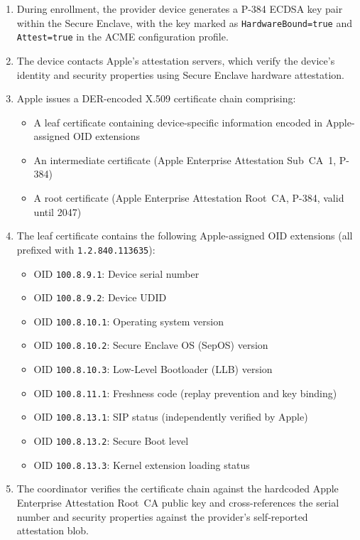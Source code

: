\documentclass[11pt,letterpaper]{article}
\begin{document}
\begin{enumerate}[nosep]
\item During enrollment, the provider device generates a P-384 ECDSA key pair within the Secure Enclave, with the key marked as \texttt{HardwareBound=true} and \texttt{Attest=true} in the ACME configuration profile.

\item The device contacts Apple's attestation servers, which verify the device's identity and security properties using Secure Enclave hardware attestation.

\item Apple issues a DER-encoded X.509 certificate chain comprising:
  \begin{itemize}[nosep]
  \item A leaf certificate containing device-specific information encoded in Apple-assigned OID extensions
  \item An intermediate certificate (Apple Enterprise Attestation Sub~CA~1, P-384)
  \item A root certificate (Apple Enterprise Attestation Root~CA, P-384, valid until 2047)
  \end{itemize}

\item The leaf certificate contains the following Apple-assigned OID extensions (all prefixed with \texttt{1.2.840.113635}):
  \begin{itemize}[nosep]
  \item OID \texttt{100.8.9.1}: Device serial number
  \item OID \texttt{100.8.9.2}: Device UDID
  \item OID \texttt{100.8.10.1}: Operating system version
  \item OID \texttt{100.8.10.2}: Secure Enclave OS (SepOS) version
  \item OID \texttt{100.8.10.3}: Low-Level Bootloader (LLB) version
  \item OID \texttt{100.8.11.1}: Freshness code (replay prevention and key binding)
  \item OID \texttt{100.8.13.1}: SIP status (independently verified by Apple)
  \item OID \texttt{100.8.13.2}: Secure Boot level
  \item OID \texttt{100.8.13.3}: Kernel extension loading status
  \end{itemize}

\item The coordinator verifies the certificate chain against the hardcoded Apple Enterprise Attestation Root~CA public key and cross-references the serial number and security properties against the provider's self-reported attestation blob.
\end{enumerate}
\end{document}
